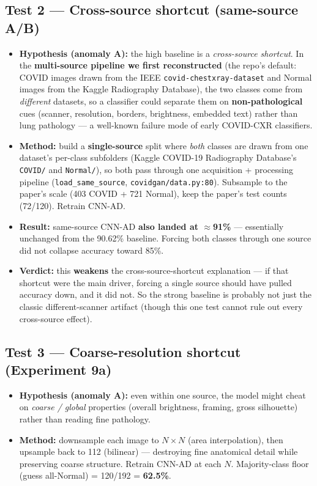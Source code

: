 \documentclass[11pt]{article}
\newcommand{\code}[1]{\texttt{#1}}
\begin{document}
\subsection{Test 2 --- Cross-source shortcut (same-source A/B)}
\begin{itemize}[nosep,leftmargin=1.4em]
  \item \textbf{Hypothesis (anomaly A):} the high baseline is a
        \emph{cross-source shortcut}. In the \textbf{multi-source pipeline we first
        reconstructed} (the repo's default: COVID images drawn from the IEEE
        \code{covid-chestxray-dataset} and Normal images from the Kaggle
        Radiography Database), the two classes come from \emph{different} datasets,
        so a classifier could separate them on \textbf{non-pathological} cues
        (scanner, resolution, borders, brightness, embedded text) rather than lung
        pathology --- a well-known failure mode of early COVID-CXR classifiers.
  \item \textbf{Method:} build a \textbf{single-source} split where \emph{both}
        classes are drawn from one dataset's per-class subfolders (Kaggle COVID-19
        Radiography Database's \code{COVID/} and \code{Normal/}), so both pass
        through one acquisition + processing pipeline (\code{load\_same\_source},
        \code{covidgan/data.py:80}). Subsample to the paper's scale (403 COVID +
        721 Normal), keep the paper's test counts (72/120). Retrain CNN-AD.
  \item \textbf{Result:} same-source CNN-AD \textbf{also landed at $\approx$91\%}
        --- essentially unchanged from the 90.62\% baseline. Forcing both classes
        through one source did not collapse accuracy toward 85\%.
  \item \textbf{Verdict:} this \textbf{weakens} the cross-source-shortcut
        explanation --- if that shortcut were the main driver, forcing a single
        source should have pulled accuracy down, and it did not. So the strong
        baseline is probably not just the classic different-scanner artifact
        (though this one test cannot rule out every cross-source effect).
\end{itemize}

\subsection{Test 3 --- Coarse-resolution shortcut (Experiment 9a)}
\begin{itemize}[nosep,leftmargin=1.4em]
  \item \textbf{Hypothesis (anomaly A):} even within one source, the model might
        cheat on \emph{coarse / global} properties (overall brightness, framing,
        gross silhouette) rather than reading fine pathology.
  \item \textbf{Method:} downsample each image to $N{\times}N$ (area
        interpolation), then upsample back to 112 (bilinear) --- destroying fine
        anatomical detail while preserving coarse structure. Retrain CNN-AD at each
        $N$. Majority-class floor (guess all-Normal) = 120/192 = \textbf{62.5\%}.
\end{itemize}
\end{document}
